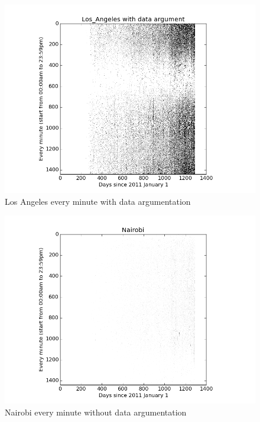 \documentclass[a4paper,12pt]{article}
\begin{document}
 \begin{figure}[H]
  \begin{center}
      \includegraphics[scale=0.8]{Los_Angelesbinary.png}
\end{center}
\caption{Los Angeles every minute with data argumentation}
 \label {fig:2}
 \end{figure}



 \begin{figure}[H]
  \begin{center}
      \includegraphics[scale=0.8]{Nairobi.png}
\end{center}
\caption{Nairobi every minute without data argumentation}
 \label {fig:2}
 \end{figure}
 
\end{document}
